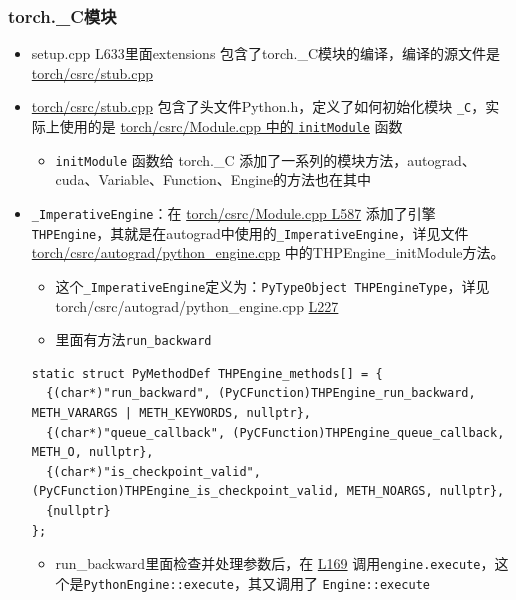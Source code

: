 \subsubsection{torch.\_C模块}

\begin{itemize}
\item
  setup.cpp L633里面extensions 包含了torch.\_C模块的编译，编译的源文件是
  \href{https://github.com/pytorch/pytorch/blob/master/torch/csrc/stub.cpp}{torch/csrc/stub.cpp}
\item
  \href{https://github.com/pytorch/pytorch/blob/master/torch/csrc/stub.cpp}{torch/csrc/stub.cpp}
  包含了头文件Python.h，定义了如何初始化模块
  \texttt{\_C}，实际上使用的是
  \href{https://github.com/pytorch/pytorch/blob/master/torch/csrc/Module.cpp\#L542}{torch/csrc/Module.cpp
  中的 \texttt{initModule}} 函数

  \begin{itemize}
  \tightlist
  \item
    \texttt{initModule} 函数给 torch.\_C
    添加了一系列的模块方法，autograd、cuda、Variable、Function、Engine的方法也在其中
  \end{itemize}
\item
  \texttt{\_ImperativeEngine}：在
  \href{https://github.com/pytorch/pytorch/blob/master/torch/csrc/Module.cpp\#L587}{torch/csrc/Module.cpp
  L587} 添加了引擎
  \texttt{THPEngine}，其就是在autograd中使用的\texttt{\_ImperativeEngine}，详见文件
  \href{https://github.com/pytorch/pytorch/blob/master/torch/csrc/autograd/python_engine.cpp}{torch/csrc/autograd/python\_engine.cpp}
  中的THPEngine\_initModule方法。

  \begin{itemize}
  \tightlist
  \item
    这个\texttt{\_ImperativeEngine}定义为：\texttt{PyTypeObject\ THPEngineType}，详见
    torch/csrc/autograd/python\_engine.cpp
    \href{https://github.com/pytorch/pytorch/blob/master/torch/csrc/autograd/python_engine.cpp\#L227}{L227}
  \item
    里面有方法\texttt{run\_backward}
  \end{itemize}

\begin{lstlisting}
static struct PyMethodDef THPEngine_methods[] = {
  {(char*)"run_backward", (PyCFunction)THPEngine_run_backward, METH_VARARGS | METH_KEYWORDS, nullptr},
  {(char*)"queue_callback", (PyCFunction)THPEngine_queue_callback, METH_O, nullptr},
  {(char*)"is_checkpoint_valid", (PyCFunction)THPEngine_is_checkpoint_valid, METH_NOARGS, nullptr},
  {nullptr}
};
\end{lstlisting}


  \begin{itemize}
  \tightlist
  \item
    run\_backward里面检查并处理参数后，在
    \href{https://github.com/pytorch/pytorch/blob/master/torch/csrc/autograd/python_engine.cpp\#L169}{L169}
    调用\texttt{engine.execute}，这个是\texttt{PythonEngine::execute}，其又调用了
    \texttt{Engine::execute}
  \end{itemize}
\end{itemize}

